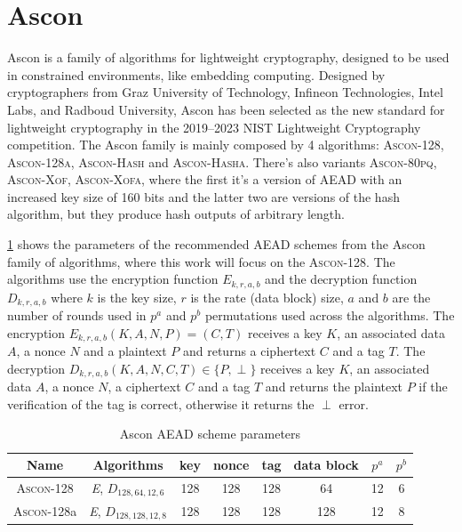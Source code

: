 \documentclass[11pt,twoside]{article}
\begin{document}
\section{Ascon}

Ascon is a family of algorithms for lightweight cryptography, designed to be used in constrained environments, like embedding computing. Designed by cryptographers from Graz University of Technology, Infineon Technologies, Intel Labs, and Radboud University, Ascon has been selected as the new standard for lightweight cryptography in the 2019–2023 NIST Lightweight Cryptography competition. The Ascon family is mainly composed by 4 algorithms: \textsc{Ascon-128}, \textsc{Ascon-128a}, \textsc{Ascon-Hash} and \textsc{Ascon-Hasha}. There's also variants \textsc{Ascon-80pq}, \textsc{Ascon-Xof}, \textsc{Ascon-Xofa}, where the first it's a version of AEAD with an increased key size of 160 bits and the latter two are versions of the hash algorithm, but they produce hash outputs of arbitrary length.

\cref{table:aeadParameters} shows the parameters of the recommended AEAD schemes from the Ascon family of algorithms, where this work will focus on the \textsc{Ascon-128}. The algorithms use the encryption function $\textit{E}_{k,r,a,b}$ and the decryption function $\textit{D}_{k,r,a,b}$ where $k$ is the key size, $r$ is the rate (data block) size, $a$ and $b$ are the number of rounds used in $p^a$ and $p^b$ permutations used across the algorithms. The encryption $\textit{E}_{k,r,a,b}(K, A, N, P) = (C, T)$ receives a key $K$, an associated data $A$, a nonce $N$ and a plaintext $P$ and returns a ciphertext $C$ and a tag $T$. The decryption $\textit{D}_{k,r,a,b}(K, A, N, C, T) \in \{P, \perp\}$ receives a key $K$, an associated data $A$, a nonce $N$, a ciphertext $C$ and a tag $T$ and returns the plaintext $P$ if the verification of the tag is correct, otherwise it returns the $\perp$ error.

\begin{table} [h]
  \centering
  \begin{tabular}{|c|c|cccc|cc|}
    \hline
    \textbf{Name}       & \textbf{Algorithms}                     & \textbf{key} & \textbf{nonce} & \textbf{tag} & \textbf{data block} & \textbf{$p^a$} & \textbf{$p^b$} \\ \hline
    \textsc{Ascon-128}  & \textit{E}, $\textit{D}_{128,64,12,6}$  & 128          & 128            & 128          & 64                  & 12             & 6              \\ \hline
    \textsc{Ascon-128}a & \textit{E}, $\textit{D}_{128,128,12,8}$ & 128          & 128            & 128          & 128                 & 12             & 8              \\ \hline
  \end{tabular}
  \caption{Ascon AEAD scheme parameters}
  \label{table:aeadParameters}
\end{table}
\end{document}
